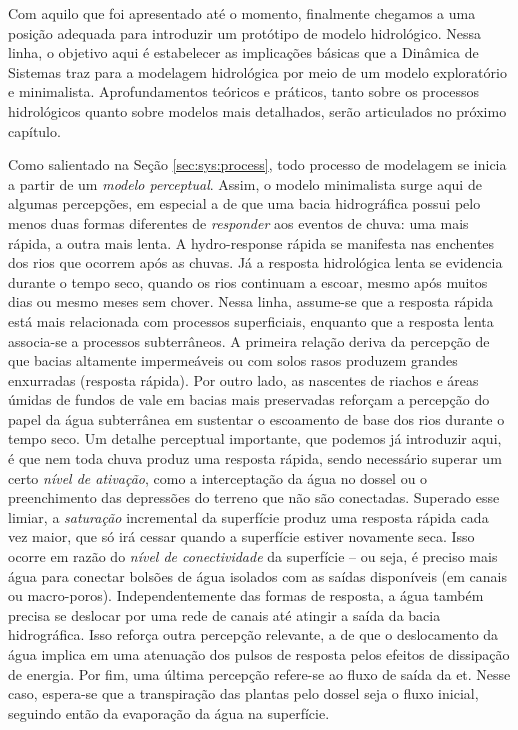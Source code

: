 \documentclass[./main.tex]{subfiles}
\begin{document}
\par Com aquilo que foi apresentado até o momento, finalmente chegamos a uma posição adequada para introduzir um protótipo de modelo hidrológico. Nessa linha, o objetivo aqui é estabelecer as implicações básicas que a Dinâmica de Sistemas traz para a modelagem hidrológica por meio de um modelo exploratório e minimalista. Aprofundamentos teóricos e práticos, tanto sobre os processos hidrológicos quanto sobre modelos mais detalhados, serão articulados no próximo capítulo. 

\par Como salientado na Seção \ref{sec:sys:process}, todo processo de modelagem se inicia a partir de um \textit{modelo perceptual}. Assim, o modelo minimalista surge aqui de algumas percepções, em especial a de que uma bacia hidrográfica possui pelo menos duas formas diferentes de \textit{responder} aos eventos de chuva: uma mais rápida, a outra mais lenta. A \gls{hydro-response} rápida se manifesta nas enchentes dos rios que ocorrem após as chuvas. Já a resposta hidrológica lenta se evidencia durante o tempo seco, quando os rios continuam a escoar, mesmo após muitos dias ou mesmo meses sem chover. Nessa linha, assume-se que a resposta rápida está mais relacionada com processos superficiais, enquanto que a resposta lenta associa-se a processos subterrâneos. A primeira relação deriva da percepção de que bacias altamente impermeáveis ou com solos rasos produzem grandes enxurradas (resposta rápida). Por outro lado, as nascentes de riachos e áreas úmidas de fundos de vale em bacias mais preservadas reforçam a percepção do papel da água subterrânea em sustentar o escoamento de base dos rios durante o tempo seco. Um detalhe perceptual importante, que podemos já introduzir aqui, é que nem toda chuva produz uma resposta rápida, sendo necessário superar um certo \textit{nível de ativação}, como a interceptação da água no dossel ou o preenchimento das depressões do terreno que não são conectadas. Superado esse limiar, a \textit{saturação} incremental da superfície produz uma resposta rápida cada vez maior, que só irá cessar quando a superfície estiver novamente seca. Isso ocorre em razão do \textit{nível de conectividade} da superfície -- ou seja, é preciso mais água para conectar bolsões de água isolados com as saídas disponíveis (em canais ou macro-poros). Independentemente das formas de resposta, a água também precisa se deslocar por uma rede de canais até atingir a saída da bacia hidrográfica. Isso reforça outra percepção relevante, a de que o deslocamento da água implica em uma atenuação dos pulsos de resposta pelos efeitos de dissipação de energia. Por fim, uma última percepção refere-se ao fluxo de saída da \acrfull{et}. Nesse caso, espera-se que a transpiração das plantas pelo dossel seja o fluxo inicial, seguindo então da evaporação da água na superfície. 
\end{document}
